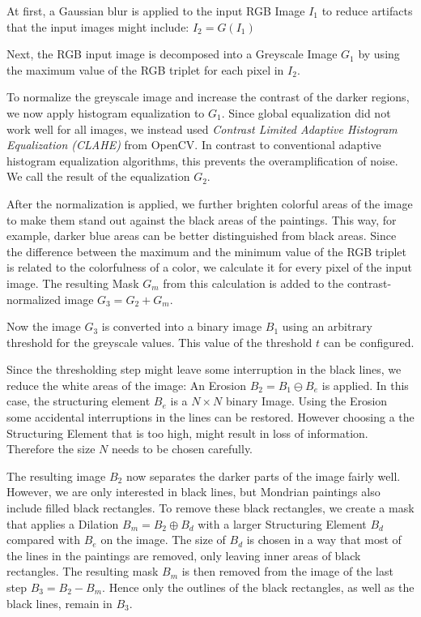 
At first, a Gaussian blur is applied to the input RGB Image
$I_1$ to reduce artifacts that the input images might include: $I_2 = G(I_1)$

Next, the RGB input image is decomposed into a Greyscale Image $G_1$ by using
the maximum value of the RGB triplet for each pixel in $I_2$.


To normalize the greyscale image and increase the contrast of the darker
regions, we now apply histogram equalization to $G_1$. Since global equalization
did not work well for all images, we instead used \textit{Contrast Limited
Adaptive Histogram Equalization (CLAHE)} from OpenCV. In contrast to
conventional adaptive histogram equalization algorithms, this prevents the
overamplification of noise. We call the result of the equalization $G_2$.

After the normalization is applied, we further brighten colorful areas of the
image to make them stand out against the black areas of the paintings. This way,
for example, darker blue areas can be better distinguished from black areas.
Since the difference between the maximum and the minimum value of the RGB
triplet is related to the colorfulness of a color, we calculate it for every
pixel of the input image. The resulting Mask $G_m$ from this calculation is added to
the contrast-normalized image $G_3 = G_2 + G_m$.

Now the image $G_3$ is converted into a binary image $B_1$ using an arbitrary
threshold for the greyscale values. This value of the threshold $t$ can be
configured.


Since the thresholding step might leave some interruption in the black lines, we
reduce the white areas of the image: An Erosion $B_2 = B_1 \ominus B_e$ is
applied. In this case, the structuring element $B_e$ is a $N\times N$ binary
Image. Using the Erosion some accidental interruptions in the lines can be
restored. However choosing a the Structuring Element that is too high, might
result in loss of information. Therefore the size $N$ needs to be chosen
carefully.

The resulting image $B_2$ now separates the darker parts of the image fairly
well. However, we are only interested in black lines, but Mondrian paintings
also include filled black rectangles. To remove these black rectangles, we
create a mask that applies a Dilation $B_m = B_2 \oplus B_d$ with a larger
Structuring Element $B_d$ compared with $B_e$ on the image. The size of $B_d$ is
chosen in a way that most of the lines in the paintings are removed, only
leaving inner areas of black rectangles. The resulting mask $B_m$ is then
removed from the image of the last step $B_3 = B_2 - B_m$. Hence only the
outlines of the black rectangles, as well as the black lines, remain in $B_3$.

